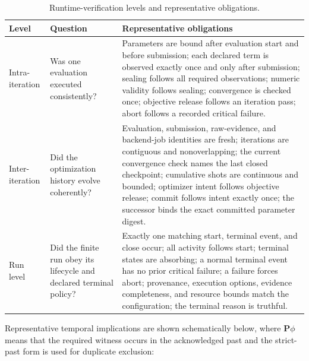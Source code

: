 \begin{table}[t]
  \centering
  \caption{Runtime-verification levels and representative obligations.}
  \label{tab:rv-levels}
  \renewcommand{\arraystretch}{1.12}
  \begin{tabular}{p{}p{}p{}}
    \toprule
    Level & Question & Representative obligations \\
    \midrule
    Intra-iteration
      & Was one evaluation executed consistently?
      & Parameters are bound after evaluation start and before submission;
        each declared term is observed exactly once and only after submission;
        sealing follows all required observations; numeric validity follows
        sealing; convergence is checked once; objective release follows an
        iteration pass; abort follows a recorded critical failure. \\
    Inter-iteration
      & Did the optimization history evolve coherently?
      & Evaluation, submission, raw-evidence, and backend-job identities are
        fresh; iterations are contiguous and nonoverlapping; the current
        convergence check names the last closed checkpoint; cumulative shots
        are continuous and bounded; optimizer intent follows objective release;
        commit follows intent exactly once; the successor binds the exact
        committed parameter digest. \\
    Run level
      & Did the finite run obey its lifecycle and declared terminal policy?
      & Exactly one matching start, terminal event, and close occur; all
        activity follows start; terminal states are absorbing; a normal terminal
        event has no prior critical failure; a failure forces abort; provenance,
        execution options, evidence completeness, and resource bounds match the
        configuration; the terminal reason is truthful. \\
    \bottomrule
  \end{tabular}
\end{table}

Representative temporal implications are shown schematically below, where
$\mathbf{P}\phi$ means that the required witness occurs in the acknowledged
past and the strict-past form is used for duplicate exclusion:

